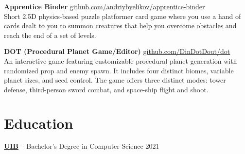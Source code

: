 \documentclass[10pt]{article}       %
\begin{document}

\vspace{5pt}
\textbf{Apprentice Binder} \hfill \href{https://github.com/andriybyelikov/apprentice-binder}{github.com/andriybyelikov/apprentice-binder} \\
Short 2.5D physics-based puzzle platformer card game where you use a hand of cards dealt to you to
summon creatures that help you overcome obstacles and reach the end of a set of levels.

\vspace{5pt}
\textbf{DOT (Procedural Planet Game/Editor)} \hfill \href{https://github.com/DinDotDout/dot}{github.com/DinDotDout/dot} \\
An interactive game featuring customizable procedural planet generation with randomized prop
and enemy spawn. It includes four distinct biomes, variable planet sizes, and seed control.
The game offers three distinct modes: tower defense, third-person sword combat, and space-ship flight and shoot.
\vspace{5pt}
\vspace{-18.5pt}
\section*{Education}
\textbf{\href{https://www.uib.eu/}{UIB}} -- Bachelor's Degree in Computer Science \hfill 2021 \\
\end{document}
